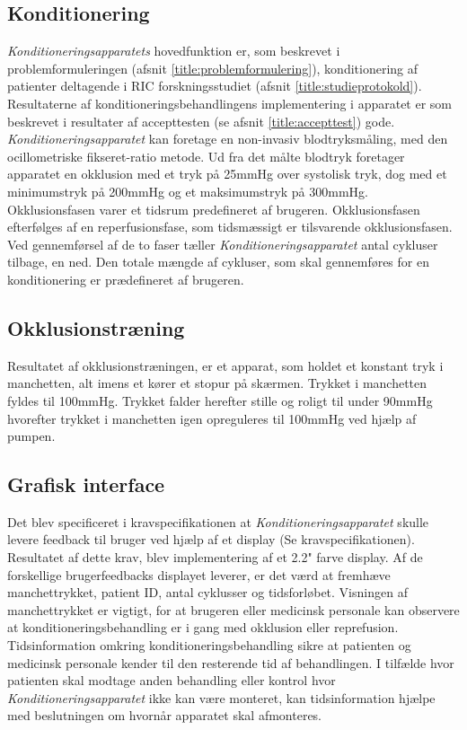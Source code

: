 \subsection{Konditionering}
\textit{Konditioneringsapparatets} hovedfunktion er, som beskrevet i problemformuleringen (afsnit \ref{title:problemformulering}), konditionering af patienter deltagende i RIC forskningsstudiet (afsnit \ref{title:studieprotokold}). Resultaterne af konditioneringsbehandlingens implementering i apparatet er som beskrevet i resultater af accepttesten (se afsnit \ref{title:accepttest}) gode. \textit{Konditioneringsapparatet} kan foretage en non-invasiv blodtryksmåling, med den ocillometriske fikseret-ratio metode. Ud fra det målte blodtryk foretager apparatet en okklusion med et tryk på 25mmHg over systolisk tryk, dog med et minimumstryk på 200mmHg og et maksimumstryk på 300mmHg. Okklusionsfasen varer et tidsrum predefineret af brugeren. Okklusionsfasen efterfølges af en reperfusionsfase, som tidsmæssigt er tilsvarende okklusionsfasen. Ved gennemførsel af de to faser tæller \textit{Konditioneringsapparatet} antal cykluser tilbage, en ned. Den totale mængde af cykluser, som skal gennemføres for en konditionering er prædefineret af brugeren.

\subsection{Okklusionstræning}
Resultatet af okklusionstræningen, er et apparat, som holdet et konstant tryk i manchetten, alt imens et kører et stopur på skærmen. Trykket i manchetten fyldes til 100mmHg. Trykket falder herefter stille og roligt til under 90mmHg hvorefter trykket i manchetten igen opreguleres til 100mmHg ved hjælp af pumpen. 
 
\subsection{Grafisk interface}
Det blev specificeret i kravspecifikationen at \textit{Konditioneringsapparatet} skulle levere feedback til bruger ved hjælp af et display (Se kravspecifikationen). Resultatet af dette krav, blev implementering af et 2.2" farve display. Af de forskellige brugerfeedbacks displayet leverer, er det værd at fremhæve manchettrykket, patient ID, antal cyklusser og tidsforløbet. Visningen af manchettrykket er vigtigt, for at brugeren eller medicinsk personale kan observere at konditioneringsbehandling er i gang med okklusion eller reprefusion. Tidsinformation omkring konditioneringsbehandling sikre at patienten og medicinsk personale kender til den resterende tid af behandlingen. I tilfælde hvor patienten skal modtage anden behandling eller kontrol hvor \textit{Konditioneringsapparatet} ikke kan være monteret, kan tidsinformation hjælpe med beslutningen om hvornår apparatet skal afmonteres. 

